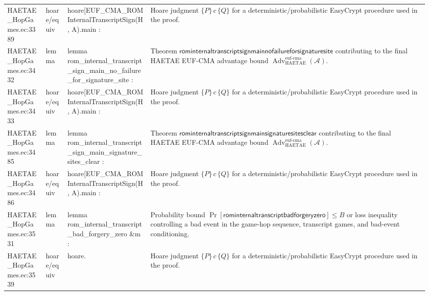 \documentclass[10pt]{article}
\newcommand{\Adv}{\operatorname{Adv}}
\begin{document}
\begin{longtable}{L{0.11\textwidth}L{0.055\textwidth}L{0.385\textwidth}L{0.41\textwidth}}
HAETAE\_\allowbreak{}HopGames.\allowbreak{}ec:\allowbreak{}3389 & hoare/equiv & {\ttfamily\scriptsize hoare[EUF\_\allowbreak{}CMA\_\allowbreak{}ROMInternalTranscriptSign(H, A).main :} & Hoare judgment $\{P\}\,c\,\{Q\}$ for a deterministic/probabilistic EasyCrypt procedure used in the proof. \\
HAETAE\_\allowbreak{}HopGames.\allowbreak{}ec:\allowbreak{}3432 & lemma & {\ttfamily\scriptsize lemma rom\_\allowbreak{}internal\_\allowbreak{}transcript\_\allowbreak{}sign\_\allowbreak{}main\_\allowbreak{}no\_\allowbreak{}failure\_\allowbreak{}for\_\allowbreak{}signature\_\allowbreak{}site :} & Theorem $\mathsf{rominternaltranscriptsignmainnofailureforsignaturesite}$ contributing to the final HAETAE EUF-CMA advantage bound $\Adv_{\mathrm{HAETAE}}^{\mathrm{euf\mbox{-}cma}}(\mathcal A)$. \\
HAETAE\_\allowbreak{}HopGames.\allowbreak{}ec:\allowbreak{}3433 & hoare/equiv & {\ttfamily\scriptsize hoare[EUF\_\allowbreak{}CMA\_\allowbreak{}ROMInternalTranscriptSign(H, A).main :} & Hoare judgment $\{P\}\,c\,\{Q\}$ for a deterministic/probabilistic EasyCrypt procedure used in the proof. \\
HAETAE\_\allowbreak{}HopGames.\allowbreak{}ec:\allowbreak{}3485 & lemma & {\ttfamily\scriptsize lemma rom\_\allowbreak{}internal\_\allowbreak{}transcript\_\allowbreak{}sign\_\allowbreak{}main\_\allowbreak{}signature\_\allowbreak{}sites\_\allowbreak{}clear :} & Theorem $\mathsf{rominternaltranscriptsignmainsignaturesitesclear}$ contributing to the final HAETAE EUF-CMA advantage bound $\Adv_{\mathrm{HAETAE}}^{\mathrm{euf\mbox{-}cma}}(\mathcal A)$. \\
HAETAE\_\allowbreak{}HopGames.\allowbreak{}ec:\allowbreak{}3486 & hoare/equiv & {\ttfamily\scriptsize hoare[EUF\_\allowbreak{}CMA\_\allowbreak{}ROMInternalTranscriptSign(H, A).main :} & Hoare judgment $\{P\}\,c\,\{Q\}$ for a deterministic/probabilistic EasyCrypt procedure used in the proof. \\
HAETAE\_\allowbreak{}HopGames.\allowbreak{}ec:\allowbreak{}3531 & lemma & {\ttfamily\scriptsize lemma rom\_\allowbreak{}internal\_\allowbreak{}transcript\_\allowbreak{}bad\_\allowbreak{}forgery\_\allowbreak{}zero \&m :} & Probability bound $\Pr[\mathsf{rominternaltranscriptbadforgeryzero}]\le B$ or loss inequality controlling a bad event in the game-hop sequence, transcript games, and bad-event conditioning. \\
HAETAE\_\allowbreak{}HopGames.\allowbreak{}ec:\allowbreak{}3539 & hoare/equiv & {\ttfamily\scriptsize hoare.} & Hoare judgment $\{P\}\,c\,\{Q\}$ for a deterministic/probabilistic EasyCrypt procedure used in the proof. \\

\end{longtable}
\end{document}
